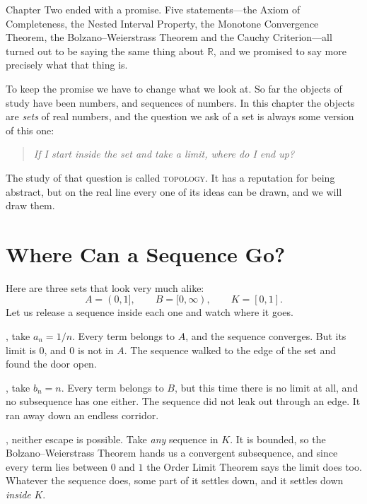 
Chapter Two ended with a promise.  Five statements---the Axiom of Completeness, the Nested Interval Property, the Monotone Convergence Theorem, the Bolzano--Weierstrass Theorem and the Cauchy Criterion---all turned out to be saying the same thing about $\mathbb{R}$, and we promised to say more precisely what that thing is.

To keep the promise we have to change what we look at.  So far the objects of study have been numbers, and sequences of numbers.  In this chapter the objects are \emph{sets} of real numbers, and the question we ask of a set is always some version of this one:

\begin{quote}
\emph{If I start inside the set and take a limit, where do I end up?}
\end{quote}

\noindent The study of that question is called \textsc{topology}.  It has a reputation for being abstract, but on the real line every one of its ideas can be drawn, and we will draw them.

\section{Where Can a Sequence Go?}\label{sec:three-escapes}

Here are three sets that look very much alike:
\[ A = (0,1], \qquad B = [0, \infty), \qquad K = [0,1]. \]
Let us release a sequence inside each one and watch where it goes.

, take $a_n = 1/n$.  Every term belongs to $A$, and the sequence converges.  But its limit is $0$, and $0$ is not in $A$.  The sequence walked to the edge of the set and found the door open.

, take $b_n = n$.  Every term belongs to $B$, but this time there is no limit at all, and no subsequence has one either.  The sequence did not leak out through an edge.  It ran away down an endless corridor.

, neither escape is possible.  Take \emph{any} sequence in $K$.  It is bounded, so the Bolzano--Weierstrass Theorem hands us a convergent subsequence, and since every term lies between $0$ and $1$ the Order Limit Theorem says the limit does too.  Whatever the sequence does, some part of it settles down, and it settles down \emph{inside} $K$.

